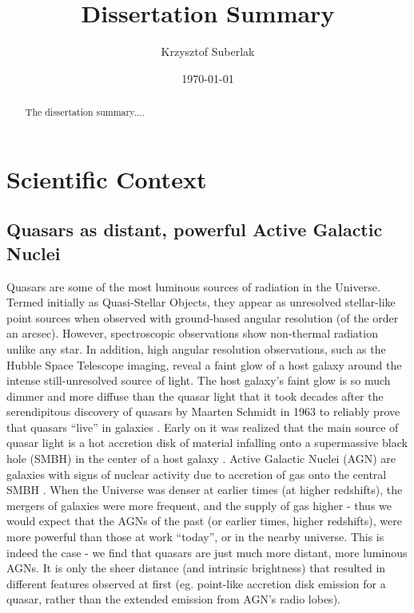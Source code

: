 \documentclass[modern]{aastex62}
\begin{document}
\title{Dissertation Summary}
\author{Krzysztof Suberlak}

\date{ \today
}

\begin{abstract}
The dissertation summary.... 
\end{abstract}

\section{Scientific Context}

\subsection{Quasars as distant, powerful Active Galactic Nuclei}
Quasars are some of the most luminous sources of radiation in the Universe.  Termed initially as Quasi-Stellar Objects, they appear as unresolved stellar-like point sources when observed with ground-based angular resolution (of the order an arcsec). However, spectroscopic observations show non-thermal radiation unlike any star. In addition, high angular resolution observations, such as the Hubble Space Telescope imaging, reveal a faint glow of a host galaxy around the intense still-unresolved source of light. The host galaxy's faint glow is so much dimmer and more diffuse than the quasar light that it took decades after the serendipitous discovery of quasars by Maarten Schmidt in 1963 \citep{schmidt1963, richards2009a} to reliably prove that quasars ``live'' in galaxies \citep{hooper1997, boyce1999, lehnert1999}. Early on it was realized that the main source of quasar light is a hot accretion disk of material infalling onto a supermassive black hole (SMBH) in the center of a host galaxy \citep{oke1965, burbidge1967}. Active Galactic Nuclei (AGN) are galaxies with signs of nuclear activity due to accretion of gas onto the central SMBH \citep{netzer2013}. When the Universe was denser at earlier times (at higher redshifts), the mergers of galaxies were more frequent, and the supply of gas higher -  thus we would expect that the AGNs of the past (or earlier times, higher redshifts), were more powerful than those at work ``today'', or in the nearby universe. This is indeed the case - we find that quasars are just much more distant, more luminous AGNs. It is only the sheer distance (and intrinsic brightness) that resulted in different features observed at first (eg. point-like accretion disk emission for a quasar, rather than the extended emission from AGN's radio lobes).  
\end{document}
